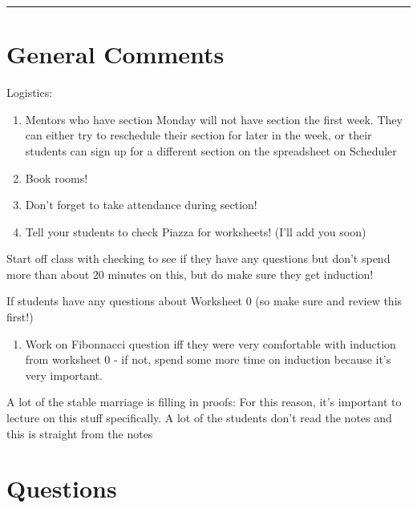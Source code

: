 \documentclass{exam}
\title{}
\date{Quantifiers, Methods of Proof}
\begin{document}
\maketitle
\rule{\textwidth}{0.15em}
\fontsize{12}{15}\selectfont
\thispagestyle{empty}


\section{General Comments}
\begin{questions}
\item Logistics: 
\begin{enumerate}[label=(\alph*)]
\item Mentors who have section Monday will not have section the first week. They can either try to reschedule their section for later in the week, or their students can sign up for a different section on the spreadsheet on Scheduler
\item Book rooms!
\item Don’t forget to take attendance during section!
\item Tell your students to check Piazza for worksheets! (I’ll add you soon)
\end{enumerate}
\item Start off class with checking to see if they have any questions but don’t spend more than about 20 minutes on this, but do make sure they get induction!
\item If students have any questions about Worksheet 0 (so make sure and review this first!)
\begin{enumerate}[label=(\alph*)]
\item Work on Fibonnacci question iff they were very comfortable with induction from worksheet 0 - if not, spend some more time on induction because it’s very important. 
\end{enumerate}
\item A lot of the stable marriage is filling in proofs: For this reason, it’s important to lecture on this stuff specifically. A lot of the students don’t read the notes and this is straight from the notes
\end{questions}

\clearpage 

\section{Questions}
\end{document}
